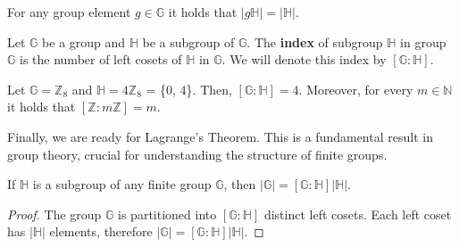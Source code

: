 \documentclass[../../book.tex]{subfiles}
\begin{document}
\begin{lemma}
    For any group element $g \in \mathbb{G}$ it holds that $\left| g\mathbb{H} \right| = \left| \mathbb{H} \right|$.
\end{lemma}

\begin{definition}
    Let $\mathbb{G}$ be a group and $\mathbb{H}$ be a subgroup of $\mathbb{G}$.
    The \textbf{index} of subgroup $\mathbb{H}$ in group $\mathbb{G}$ is the
    number of left cosets of $\mathbb{H}$ in $\mathbb{G}$. We will denote this
    index by $\left[ \mathbb{G} : \mathbb{H} \right]$.
\end{definition}

\begin{example}
    Let $\mathbb{G} = \mathbb{Z}_{8}$ and $\mathbb{H} = 4\mathbb{Z}_{8}$ = \{0,
    4\}. Then, $\left[ \mathbb{G} : \mathbb{H} \right] = 4$. Moreover, for every
    $m \in \mathbb{N}$ it holds that $\left[ \mathbb{Z} : m \mathbb{Z} \right] =
    m$.
\end{example}


Finally, we are ready for Lagrange's Theorem. This is a fundamental result in group
 theory, crucial for understanding the structure of finite groups.

\begin{theorem}[Lagrange]
    If $\mathbb{H}$ is a subgroup of any finite group $\mathbb{G}$, 
    then $\left| \mathbb{G} \right| = \left[ \mathbb{G} : \mathbb{H} \right] \left| \mathbb{H} \right|$.
\end{theorem}

\begin{proof}
The group $\mathbb{G}$ is partitioned into $\left[ \mathbb{G} : \mathbb{H} \right]$ distinct left cosets.
Each left coset has $\left| \mathbb{H} \right|$ elements, therefore 
$\left|\mathbb{G}\right| = \left[ \mathbb{G} : \mathbb{H} \right] \left| \mathbb{H} \right|$.
\end{proof}
\end{document}
